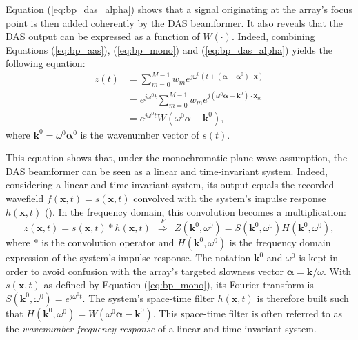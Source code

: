 Equation (\ref{eq:bp_das_alpha}) shows that a signal originating at the array's focus point is then added coherently by the DAS beamformer.
It also reveals that the DAS output can be expressed as a function of $W(\cdot)$. Indeed, combining Equations (\ref{eq:bp_aas}), (\ref{eq:bp_mono}) and (\ref{eq:bp_das_alpha}) yields the following equation:
\begin{align}
    z(t) &= \sum_{m=0}^{M-1} w_m e^{j \omega^0 (t + (\boldsymbol{\alpha} - \boldsymbol{\alpha}^0) \cdot \boldsymbol{x})} \nonumber \\
    &= e^{j \omega^0 t} \sum_{m=0}^{M-1} w_m e^{j (\omega^0 \boldsymbol{\alpha} - \boldsymbol{k}^0) \cdot \boldsymbol{x}_m} \nonumber \\
    &= e^{j \omega^0 t} W(\omega^0 \alpha - \boldsymbol{k}^0),
\end{align}
\noindent
where $\boldsymbol{k}^0 = \omega^0 \boldsymbol{\alpha}^0$ is the wavenumber vector of $s(t)$.

This equation shows that, under the monochromatic plane wave assumption, the DAS beamformer can be seen as a linear and time-invariant system.
Indeed, considering a linear and time-invariant system, its output equals the recorded wavefield $f(\boldsymbol{x},t) = s(\boldsymbol{x}, t)$ convolved with the system's impulse response $h(\boldsymbol{x}, t)$ (\cite{Dudgeon_book}).
In the frequency domain, this convolution becomes a multiplication:
\begin{equation}
    z(\boldsymbol{x}, t) = s(\boldsymbol{x}, t) * h(\boldsymbol{x}, t) ~~ \overset{F}{\Longrightarrow} ~~  Z(\boldsymbol{k}^0, \omega^0) = S(\boldsymbol{k}^0, \omega^0) H(\boldsymbol{k}^0, \omega^0),
\end{equation}
where $*$ is the convolution operator and $H(\boldsymbol{k}^0, \omega^0)$ is the frequency domain expression of the system's impulse response. The notation $\boldsymbol{k}^0$ and $\omega^0$ is kept in order to avoid confusion with the array's targeted slowness vector $\boldsymbol{\alpha} = \boldsymbol{k} / \omega$.
With $s(\boldsymbol{x},t)$ as defined by Equation (\ref{eq:bp_mono}), its Fourier transform is $S(\boldsymbol{k}^0, \omega^0) = e^{j \omega^0 t}$.
The system's space-time filter $h(\boldsymbol{x}, t)$ is therefore built such that $H(\boldsymbol{k}^0, \omega^0) = W(\omega^0 \boldsymbol{\alpha} - \boldsymbol{k}^0)$. This space-time filter is often referred to as the \textit{wavenumber-frequency response} of a linear and time-invariant system.

